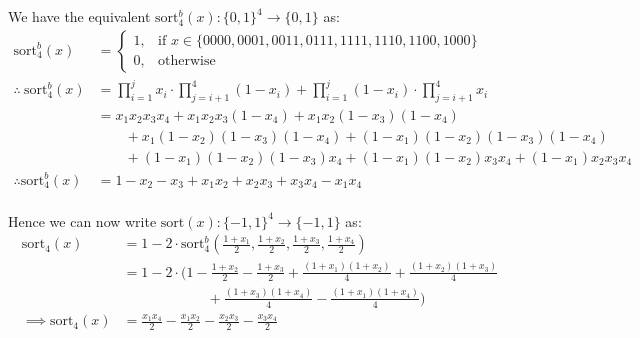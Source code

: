 \documentclass{article}
\begin{document}
We have the equivalent $\text{sort}^b_4(x): {\{0, 1\}}^4 \rightarrow \{0, 1\}$ as:
\begin{align*}
	\text{sort}^b_4(x) &= \begin{cases}
		1, & \text{if } x \in \{0000, 0001, 0011, 0111, 1111, 1110, 1100, 1000\} \\
		0, & \text{otherwise}
	\end{cases} \\
\therefore\ \text{sort}^b_4(x) &= \prod_{i=1}^j x_i \cdot \prod_{j=i+1}^4 (1 - x_i) + \prod_{i=1}^j (1 - x_i) \cdot \prod_{j=i+1}^4 x_i \\
	&= x_1 x_2 x_3 x_4 + x_1 x_2 x_3 (1 - x_4) + x_1 x_2 (1 - x_3) (1 - x_4) \\
	&\qquad+ x_1 (1 - x_2) (1 - x_3) (1 - x_4) + (1 - x_1) (1 - x_2) (1 - x_3) (1 - x_4) \\
	&\qquad+ (1 - x_1) (1 - x_2) (1 - x_3) x_4 + (1 - x_1) (1 - x_2) x_3 x_4 + (1 - x_1) x_2 x_3 x_4 \\
\therefore \text{sort}^b_4(x) &= 1 - x_2 - x_3 + x_1 x_2 + x_2 x_3 + x_3 x_4 - x_1 x_4 \\
\end{align*}

\noindent
Hence we can now write $\text{sort}(x): {\{-1, 1\}}^4 \rightarrow \{-1, 1\}$ as:
\begin{align*}
	\text{sort}_4(x) &= 1 - 2 \cdot \text{sort}^b_4\left(\frac{1+x_1}{2}, 
	\frac{1+x_2}{2}, \frac{1+x_3}{2}, \frac{1+x_4}{2}\right) \\
	&= 1 - 2 \cdot (1 - \frac{1 + x_2}{2} - \frac{1 + x_3}{2} + \frac{(1 + x_1)(1 + x_2)}{4} + \frac{(1 + x_2)(1 + x_3)}{4} \\ 
	& \qquad\qquad\qquad + \frac{(1 + x_3)(1 + x_4)}{4} - \frac{(1 + x_1)(1 + x_4)}{4}) \\ 
\implies \text{sort}_4(x) &= \boxed{\frac{x_1 x_4}{2} - \frac{x_1 x_2}{2} - 
\frac{x_2 x_3}{2} - \frac{x_3 x_4}{2}} \\
\end{align*}
\vspace*{-16mm}\begin{flushright}\qedsymbol\end{flushright}



\subsection{}
\vspace*{-8mm}
\end{document}
